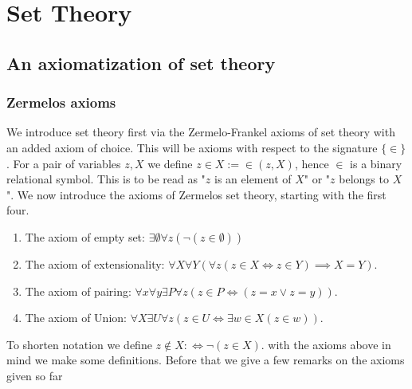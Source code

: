 \section{Set Theory}
\subsection{An axiomatization of set theory}
\subsubsection{Zermelos axioms}

We introduce set theory first via the Zermelo-Frankel axioms of set theory with an added axiom of choice. This will be axioms with respect to the signature $\{\in\}$. For a pair of variables $z,X$ we define $z\in X :=  \in(z,X)$, hence $\in$ is a binary relational symbol. This is to be read as "$z$ is an element of $X$" or "$z$ belongs to $X$". We now introduce the axioms of Zermelos set theory, starting with the first four. 
\begin{axioms}
    \begin{enumerate}\addtocounter{enumi}{-1}
        \item The axiom of empty set: $\exists \emptyset\forall z(\neg(z\in \emptyset))$
        \item The axiom of extensionality: $\forall X\forall Y(\forall z(z\in X \iff z \in Y)\implies X=Y)$.
        \item The axiom of pairing: $\forall x\forall y\exists P \forall z\left(z\in P \iff \left(z = x \vee z = y\right)\right)$.
        \item The axiom of Union: $\forall X\exists U \forall z ( z \in U \iff \exists w \in X(z\in w))$.
    \end{enumerate}
\end{axioms}
To shorten notation we define $z\notin X :\iff \neg(z\in X)$. with the axioms above in mind we make some definitions. Before that we give a few remarks on the axioms given so far
